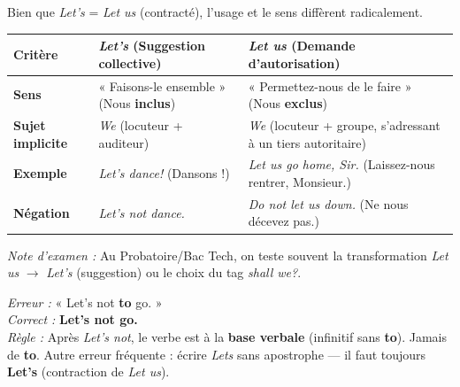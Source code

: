 \documentclass[11pt]{article}
\begin{document}
\begin{propriete}
Bien que \emph{Let's} = \emph{Let us} (contracté), l'usage et le sens diffèrent radicalement.
\begin{center}
\begin{tabularx}{\linewidth}{|l|X|X|}\hline
\textbf{Critère} & \textbf{\emph{Let's} (Suggestion collective)} & \textbf{\emph{Let us} (Demande d'autorisation)} \\ \hline
\textbf{Sens} & « Faisons-le ensemble » (Nous \textbf{inclus}) & « Permettez-nous de le faire » (Nous \textbf{exclus}) \\ \hline
\textbf{Sujet implicite} & \emph{We} (locuteur + auditeur) & \emph{We} (locuteur + groupe, s'adressant à un tiers autoritaire) \\ \hline
\textbf{Exemple} & \emph{Let's dance!} (Dansons !) & \emph{Let us go home, Sir.} (Laissez-nous rentrer, Monsieur.) \\ \hline
\textbf{Négation} & \emph{Let's not dance.} & \emph{Do not let us down.} (Ne nous décevez pas.) \\ \hline
\end{tabularx}
\end{center}
\emph{Note d'examen :} Au Probatoire/Bac Tech, on teste souvent la transformation \emph{Let us} $\to$ \emph{Let's} (suggestion) ou le choix du tag \emph{shall we?}.
\end{propriete}

\begin{attention}
\emph{Erreur :} « Let's not \textbf{to} go. » \\
\emph{Correct :} \textbf{Let's not go.} \\
\emph{Règle :} Après \emph{Let's not}, le verbe est à la \textbf{base verbale} (infinitif sans \textbf{to}). Jamais de \textbf{to}. Autre erreur fréquente : écrire \emph{Lets} sans apostrophe — il faut toujours \textbf{Let's} (contraction de \emph{Let us}).
\end{attention}
\end{document}
